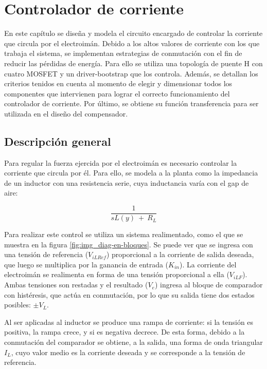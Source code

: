\chapter{Controlador de corriente}  \label{cap:ControladorCorriente}

En este capítulo se diseña y modela el circuito encargado de controlar la corriente que circula por el electroimán. Debido a los altos valores de corriente con los que trabaja el sistema, se implementan estrategias de conmutación con el fin de reducir las pérdidas de energía. Para ello se utiliza una topología de puente H con cuatro MOSFET y un driver-bootstrap que los controla. Además, se detallan los criterios tenidos en cuenta al momento de  elegir  y dimensionar todos los componentes que intervienen para lograr el correcto funcionamiento del controlador de corriente. Por último, se obtiene su función transferencia  para ser utilizada en el diseño del compensador.

\section{Descripción general}

\noindent Para regular la fuerza ejercida por el electroimán es necesario controlar la corriente que circula por él. Para ello, se modela a la planta como la impedancia de un inductor con una resistencia serie, cuya inductancia varía con el gap de aire:

\begin{equation} \label{eq_admitancia}
\frac{1}{sL(y)\ +\ R_L}
\end{equation}

\noindent Para realizar este control se utiliza un sistema realimentado, como el que se muestra en la figura \ref{fig:img_diag-en-bloques}. Se puede ver que se ingresa con una tensión de referencia ($V_{iLRef}$) proporcional a la corriente de salida deseada, que luego se multiplica por la ganancia de entrada ($K_{in}$). La corriente del electroimán se realimenta en forma de una tensión proporcional a ella ($V_{iLF}$). Ambas tensiones son restadas y el resultado ($V_e$) ingresa al bloque de comparador con histéresis, que actúa en conmutación, por lo que su salida tiene dos estados posibles: $\pm$$V_L$.

\noindent Al ser aplicadas al inductor se produce una rampa de corriente: si la tensión es positiva, la rampa crece, y si es negativa decrece. De esta forma, debido a la conmutación del comparador se obtiene, a la salida, una forma de onda triangular $I_L$, cuyo valor medio es la corriente deseada y se corresponde a la tensión de referencia.

